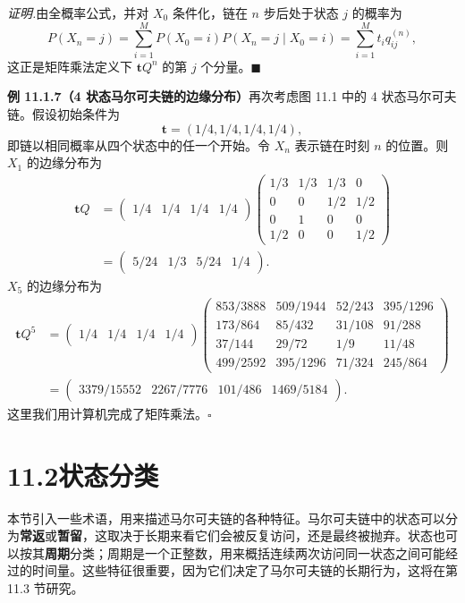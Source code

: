 \documentclass[UTF8, 12pt, fontset=fandol, oneside]{ctexart}
\begin{document}
\noindent\textit{证明.}\quad 由全概率公式，并对 $X_0$ 条件化，链在 $n$ 步后处于状态 $j$ 的概率为
\[
  P(X_n=j)
  =
  \sum_{i=1}^M P(X_0=i)P(X_n=j\mid X_0=i)
  =
  \sum_{i=1}^M t_i q_{ij}^{(n)},
\]
这正是矩阵乘法定义下 $\mathbf tQ^n$ 的第 $j$ 个分量。$\blacksquare$

\noindent\textbf{例 11.1.7（4 状态马尔可夫链的边缘分布）}\quad 再次考虑图 11.1 中的 4 状态马尔可夫链。假设初始条件为
\[
  \mathbf t=(1/4,1/4,1/4,1/4),
\]
即链以相同概率从四个状态中的任一个开始。令 $X_n$ 表示链在时刻 $n$ 的位置。则 $X_1$ 的边缘分布为
\[
\begin{aligned}
  \mathbf tQ
  &=
  \begin{pmatrix}1/4&1/4&1/4&1/4\end{pmatrix}
  \begin{pmatrix}
    1/3 & 1/3 & 1/3 & 0\\
    0 & 0 & 1/2 & 1/2\\
    0 & 1 & 0 & 0\\
    1/2 & 0 & 0 & 1/2
  \end{pmatrix}\\
  &=
  \begin{pmatrix}5/24&1/3&5/24&1/4\end{pmatrix}.
\end{aligned}
\]
$X_5$ 的边缘分布为
\[
\begin{aligned}
  \mathbf tQ^5
  &=
  \begin{pmatrix}1/4&1/4&1/4&1/4\end{pmatrix}
  \begin{pmatrix}
    853/3888 & 509/1944 & 52/243 & 395/1296\\
    173/864 & 85/432 & 31/108 & 91/288\\
    37/144 & 29/72 & 1/9 & 11/48\\
    499/2592 & 395/1296 & 71/324 & 245/864
  \end{pmatrix}\\
  &=
  \begin{pmatrix}3379/15552&2267/7776&101/486&1469/5184\end{pmatrix}.
\end{aligned}
\]
这里我们用计算机完成了矩阵乘法。$\square$

\section*{11.2\quad 状态分类}

本节引入一些术语，用来描述马尔可夫链的各种特征。马尔可夫链中的状态可以分为\textbf{常返}或\textbf{暂留}，这取决于长期来看它们会被反复访问，还是最终被抛弃。状态也可以按其\textbf{周期}分类；周期是一个正整数，用来概括连续两次访问同一状态之间可能经过的时间量。这些特征很重要，因为它们决定了马尔可夫链的长期行为，这将在第 11.3 节研究。
\end{document}
